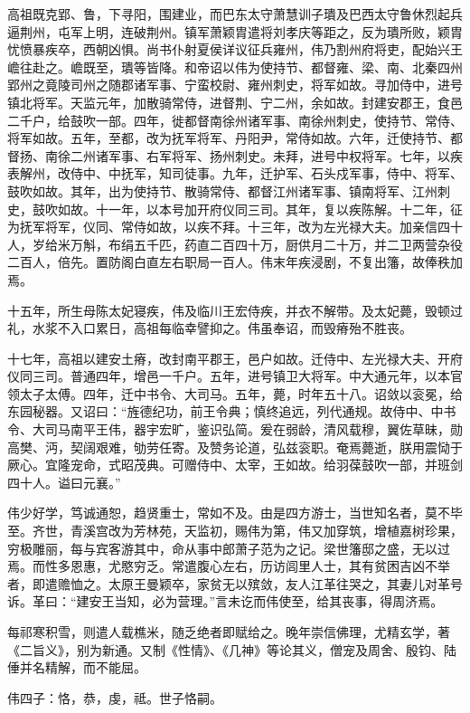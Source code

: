 \documentclass[12pt,UTF8]{ctexbook}
\begin{document}
高祖既克郢、鲁，下寻阳，围建业，而巴东太守萧慧训子璝及巴西太守鲁休烈起兵逼荆州，屯军上明，连破荆州。镇军萧颖胄遣将刘孝庆等距之，反为璝所败，颖胄忧愤暴疾卒，西朝凶惧。尚书仆射夏侯详议征兵雍州，伟乃割州府将吏，配始兴王嶦往赴之。嶦既至，璝等皆降。和帝诏以伟为使持节、都督雍、梁、南、北秦四州郢州之竟陵司州之随郡诸军事、宁蛮校尉、雍州刺史，将军如故。寻加侍中，进号镇北将军。天监元年，加散骑常侍，进督荆、宁二州，余如故。封建安郡王，食邑二千户，给鼓吹一部。四年，徙都督南徐州诸军事、南徐州刺史，使持节、常侍、将军如故。五年，至都，改为抚军将军、丹阳尹，常侍如故。六年，迁使持节、都督扬、南徐二州诸军事、右军将军、扬州刺史。未拜，进号中权将军。七年，以疾表解州，改侍中、中抚军，知司徒事。九年，迁护军、石头戍军事，侍中、将军、鼓吹如故。其年，出为使持节、散骑常侍、都督江州诸军事、镇南将军、江州刺史，鼓吹如故。十一年，以本号加开府仪同三司。其年，复以疾陈解。十二年，征为抚军将军，仪同、常侍如故，以疾不拜。十三年，改为左光禄大夫。加亲信四十人，岁给米万斛，布绢五千匹，药直二百四十万，厨供月二十万，并二卫两营杂役二百人，倍先。置防阁白直左右职局一百人。伟末年疾浸剧，不复出籓，故俸秩加焉。

十五年，所生母陈太妃寝疾，伟及临川王宏侍疾，并衣不解带。及太妃薨，毁顿过礼，水浆不入口累日，高祖每临幸譬抑之。伟虽奉诏，而毁瘠殆不胜丧。

十七年，高祖以建安土瘠，改封南平郡王，邑户如故。迁侍中、左光禄大夫、开府仪同三司。普通四年，增邑一千户。五年，进号镇卫大将军。中大通元年，以本官领太子太傅。四年，迁中书令、大司马。五年，薨，时年五十八。诏敛以衮冕，给东园秘器。又诏曰：“旌德纪功，前王令典；慎终追远，列代通规。故侍中、中书令、大司马南平王伟，器宇宏旷，鉴识弘简。爰在弱龄，清风载穆，翼佐草昧，勋高樊、沔，契阔艰难，劬劳任寄。及赞务论道，弘兹衮职。奄焉薨逝，朕用震恸于厥心。宜隆宠命，式昭茂典。可赠侍中、太宰，王如故。给羽葆鼓吹一部，并班剑四十人。谥曰元襄。”

伟少好学，笃诚通恕，趋贤重士，常如不及。由是四方游士，当世知名者，莫不毕至。齐世，青溪宫改为芳林苑，天监初，赐伟为第，伟又加穿筑，增植嘉树珍果，穷极雕丽，每与宾客游其中，命从事中郎萧子范为之记。梁世籓邸之盛，无以过焉。而性多恩惠，尤愍穷乏。常遣腹心左右，历访闾里人士，其有贫困吉凶不举者，即遣赡恤之。太原王曼颖卒，家贫无以殡敛，友人江革往哭之，其妻儿对革号诉。革曰：“建安王当知，必为营理。”言未讫而伟使至，给其丧事，得周济焉。

每祁寒积雪，则遣人载樵米，随乏绝者即赋给之。晚年崇信佛理，尤精玄学，著《二旨义》，别为新通。又制《性情》、《几神》等论其义，僧宠及周舍、殷钧、陆倕并名精解，而不能屈。

伟四子：恪，恭，虔，祗。世子恪嗣。
\end{document}
